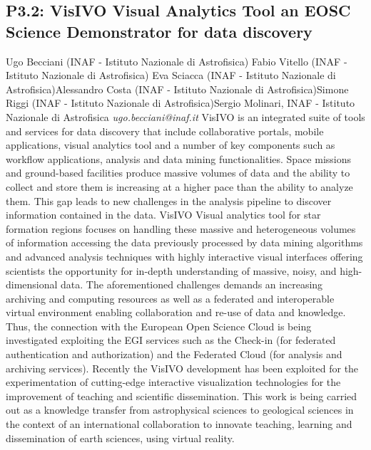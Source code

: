 \documentclass{report}
\begin{document}
\subsection*{P3.2: VisIVO Visual Analytics Tool an EOSC Science Demonstrator for data discovery}
\bigskip
Ugo Becciani (INAF - Istituto Nazionale di Astrofisica) \newline Fabio Vitello (INAF - Istituto Nazionale di Astrofisica) \newline  Eva Sciacca (INAF - Istituto Nazionale di Astrofisica)\newline  Alessandro Costa (INAF - Istituto Nazionale di Astrofisica)\newline Simone Riggi (INAF - Istituto Nazionale di Astrofisica)\newline  Sergio Molinari, INAF - Istituto Nazionale di Astrofisica\newline\newline
{\it ugo.becciani@inaf.it}\newline
\newline\newline
VisIVO is an integrated suite of tools and services for data discovery that include collaborative portals, mobile applications, visual analytics tool and a number of key components such as workflow applications, analysis and data mining functionalities. Space missions and ground-based facilities produce massive volumes of data and the ability to collect and store them is increasing at a higher pace than the ability to analyze them. This gap leads to new challenges in the analysis pipeline to discover information contained in the data. VisIVO Visual analytics tool for star formation regions focuses on handling these massive and heterogeneous volumes of information accessing the data previously processed by data mining algorithms and advanced analysis techniques with highly interactive visual interfaces offering scientists the opportunity for in-depth understanding of massive, noisy, and high-dimensional data. The aforementioned challenges demands an increasing archiving and computing resources as well as a federated and interoperable virtual environment enabling collaboration and re-use of data and knowledge. Thus, the connection with the European Open Science Cloud is being investigated exploiting the EGI services such as the Check-in (for federated authentication and authorization) and the Federated Cloud (for analysis and archiving services). Recently the VisIVO development has been exploited for the experimentation of cutting-edge interactive visualization technologies for the improvement of teaching and scientific dissemination. This work is being carried out as a knowledge transfer from astrophysical sciences to geological sciences in the context of an international collaboration to innovate teaching, learning and dissemination of earth sciences, using virtual reality.\newline
\newpage
\end{document}
